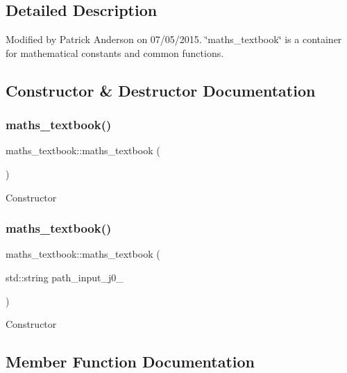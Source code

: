 \subsection{Detailed Description}
Modified by Patrick Anderson on 07/05/2015. \char`\"{}maths\+\_\+textbook\char`\"{} is a container for mathematical constants and common functions. 

\subsection{Constructor \& Destructor Documentation}
\mbox{\label{classmaths__textbook_a7be915ec6de7f305b96325ff5d821607}} 
\subsubsection{\texorpdfstring{maths\+\_\+textbook()}{maths\_textbook()}\hspace{0.1cm}{\footnotesize\ttfamily [1/2]}}
{\footnotesize\ttfamily maths\+\_\+textbook\+::maths\+\_\+textbook (\begin{DoxyParamCaption}{ }\end{DoxyParamCaption})}

Constructor \mbox{\label{classmaths__textbook_acca32bf0f3860cbb8e76687435f0fa24}} 
\subsubsection{\texorpdfstring{maths\+\_\+textbook()}{maths\_textbook()}\hspace{0.1cm}{\footnotesize\ttfamily [2/2]}}
{\footnotesize\ttfamily maths\+\_\+textbook\+::maths\+\_\+textbook (\begin{DoxyParamCaption}\item[{std\+::string}]{path\+\_\+input\+\_\+j0\+\_\+ }\end{DoxyParamCaption})}

Constructor 

\subsection{Member Function Documentation}
\mbox{\label{classmaths__textbook_ae893700d202ab9a84e33974f9ca42da3}} 
